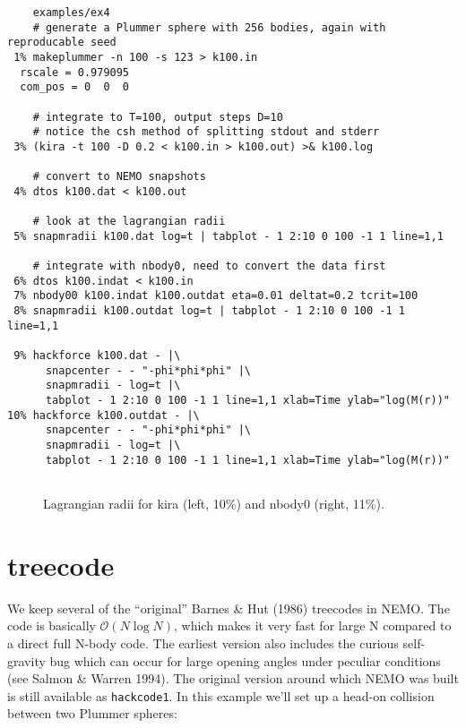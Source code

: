 \footnotesize\begin{verbatim}
    examples/ex4
    # generate a Plummer sphere with 256 bodies, again with reproducable seed
 1% makeplummer -n 100 -s 123 > k100.in
  rscale = 0.979095
  com_pos = 0  0  0

    # integrate to T=100, output steps D=10
    # notice the csh method of splitting stdout and stderr
 3% (kira -t 100 -D 0.2 < k100.in > k100.out) >& k100.log

    # convert to NEMO snapshots
 4% dtos k100.dat < k100.out

    # look at the lagrangian radii
 5% snapmradii k100.dat log=t | tabplot - 1 2:10 0 100 -1 1 line=1,1

    # integrate with nbody0, need to convert the data first
 6% dtos k100.indat < k100.in
 7% nbody00 k100.indat k100.outdat eta=0.01 deltat=0.2 tcrit=100
 8% snapmradii k100.outdat log=t | tabplot - 1 2:10 0 100 -1 1 line=1,1

 9% hackforce k100.dat - |\
      snapcenter - - "-phi*phi*phi" |\ 
      snapmradii - log=t |\
      tabplot - 1 2:10 0 100 -1 1 line=1,1 xlab=Time ylab="log(M(r))"
10% hackforce k100.outdat - |\
      snapcenter - - "-phi*phi*phi" |\
      snapmradii - log=t |\
      tabplot - 1 2:10 0 100 -1 1 line=1,1 xlab=Time ylab="log(M(r))"


\end{verbatim}\normalsize


\begin{figure}[htb]
\caption[Lagrangian radii for kira and nbody0]
{Lagrangian radii for kira (left, 10\%) and nbody0 (right, 11\%).}
\label{f:kira}
\end{figure}


\section{treecode}

We keep several of the ``original'' 
Barnes \& Hut (1986) treecodes in NEMO. 
The code is basically $\mathcal{O}(N \log{N})$, which makes it very fast 
for large N compared to a direct full N-body code.
The earliest version also
includes the curious self-gravity bug which can occur for large opening angles
under peculiar conditions (see Salmon \& Warren 1994).
The original version around which NEMO was built is still available as
{\tt hackcode1}. In this example we'll set up a head-on collision between
two Plummer spheres:

